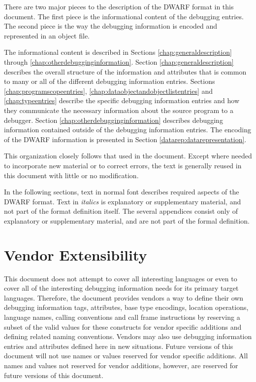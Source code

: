 There are two major pieces to the description of the DWARF
format in this document. The first piece is the informational
content of the debugging entries. The second piece is the
way the debugging information is encoded and represented in
an object file.

The informational content is described in 
Sections \ref{chap:generaldescription} 
through
\ref{chap:otherdebugginginformation}. 
Section  \ref{chap:generaldescription}
describes the overall structure of the information
and attributes that is common to many or all of the different
debugging information entries. 
Sections \ref{chap:programscopeentries}, 
\ref{chap:dataobjectandobjectlistentries} and 
\ref{chap:typeentries} describe
the specific debugging information entries and how they
communicate the necessary information about the source program
to a debugger. 
Section \ref{chap:otherdebugginginformation} 
describes debugging information
contained outside of the debugging information entries. The
encoding of the DWARF information is presented in 
Section \ref{datarep:datarepresentation}.

This organization closely follows that used in the 
\DWARFVersionIV{} document. Except where needed to incorporate
new material or to correct errors, the \DWARFVersionIV{}
text is generally reused in this document with little or
no modification.

In the following sections, text in normal font describes
required aspects of the DWARF format.  Text in \textit{italics} is
explanatory or supplementary material, and not part of the
format definition itself. The several appendices consist only
of explanatory or supplementary material, and are not part
of the formal definition.

\section{Vendor Extensibility}

This document does not attempt to cover all interesting
languages or even to cover all of the interesting debugging
information needs for its primary target languages. 
Therefore,
the document provides vendors a way to define their own
debugging information tags, attributes, base type encodings,
location operations, language names, calling conventions and
call frame instructions by reserving a subset of the valid
values for these constructs for vendor specific additions
and defining related naming conventions. 
Vendors may also use
debugging information entries and attributes defined here in
new situations. 
Future versions of this document will not use
names or values reserved for vendor specific additions. 
All
names and values not reserved for vendor additions, however,
are reserved for future versions of this document.

